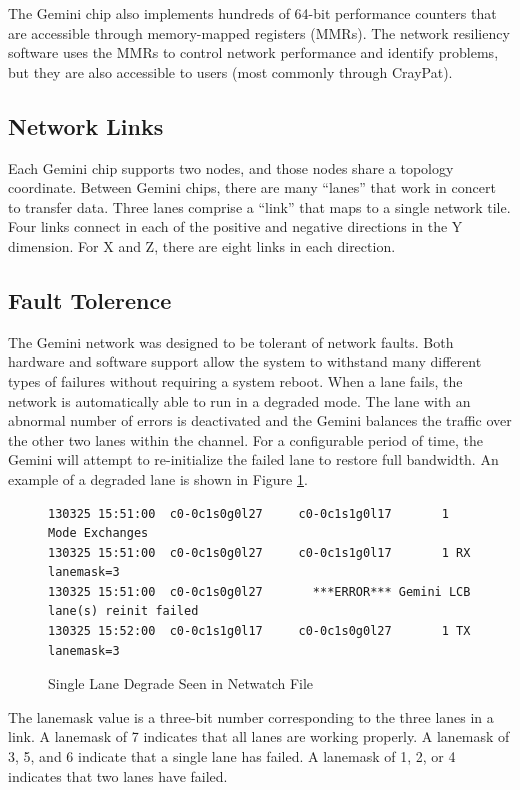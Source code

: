 \documentclass[10pt, conference, compsocconf]{IEEEtran}
\begin{document}
The Gemini chip also implements hundreds of 64-bit performance counters that
are accessible through memory-mapped registers (MMRs).  The network resiliency
software uses the MMRs to control network performance and identify problems,
but they are also accessible to users (most commonly through CrayPat).

\subsection{Network Links}

Each Gemini chip supports two nodes, and those nodes share a topology
coordinate.  Between Gemini chips, there are many ``lanes'' that work in
concert to transfer data.  Three lanes comprise a ``link'' that maps to a
single network tile.  Four links connect in each of the positive and negative
directions in the Y dimension.  For X and Z, there are eight links in each
direction.

\subsection{Fault Tolerence}

The Gemini network was designed to be tolerant of network faults.  Both
hardware and software support allow the system to withstand many different
types of failures without requiring a system reboot.  When a lane fails, the
network is automatically able to run in a degraded mode.  The lane with an
abnormal number of errors is deactivated and the Gemini balances the traffic
over the other two lanes within the channel.  For a configurable period of
time, the Gemini will attempt to re-initialize the failed lane to restore full
bandwidth.  An example of a degraded lane is shown in Figure
\ref{fig:lanedegrade}. 

\begin{figure}[ht]
  \begin{verbatim}
130325 15:51:00  c0-0c1s0g0l27     c0-0c1s1g0l17       1 Mode Exchanges                       
130325 15:51:00  c0-0c1s0g0l27     c0-0c1s1g0l17       1 RX lanemask=3                        
130325 15:51:00  c0-0c1s0g0l27       ***ERROR*** Gemini LCB lane(s) reinit failed
130325 15:52:00  c0-0c1s1g0l17     c0-0c1s0g0l27       1 TX lanemask=3                       
  \end{verbatim}
  \caption{Single Lane Degrade Seen in Netwatch File}\label{fig:lanedegrade}
\end{figure}

The lanemask value is a three-bit number corresponding to the three lanes in a
link.  A lanemask of 7 indicates that all lanes are working properly.  A
lanemask of 3, 5, and 6 indicate that a single lane has failed.  A lanemask of
1, 2, or 4 indicates that two lanes have failed.
\end{document}
